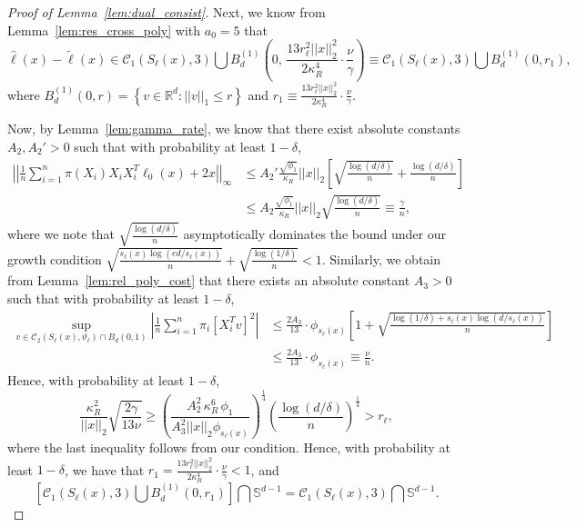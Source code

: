 \documentclass[ejsv2,noshowframe]{imsart}
\theoremstyle{plain}
\theoremstyle{definition}
\theoremstyle{remark}
\newcommand{\norm}[1]{\left|\left| #1 \right|\right|}
\renewcommand{\hat}{\widehat}
\renewcommand{\tilde}{\widetilde}
\begin{document}
\begin{proof}[Proof of Lemma~\ref{lem:dual_consist}]
	Next, we know from Lemma~\ref{lem:res_cross_poly} with $a_0=5$ that 
	$$\hat{\ell}(x)-\tilde{\ell}(x) \in \mathcal{C}_1\left(S_{\ell}(x), 3 \right) \bigcup B_d^{(1)}\left(0,\, \frac{13 r_{\ell}^2 \norm{x}_2^2}{2 \kappa_R^4} \cdot \frac{\nu}{\gamma}\right) \equiv \mathcal{C}_1\left(S_{\ell}(x), 3 \right) \bigcup B_d^{(1)}(0,r_1),$$ 
	where $B_d^{(1)}(0,r) = \left\{v\in \mathbb{R}^d: \norm{v}_1 \leq r\right\}$ and $r_1\equiv \frac{13 r_{\ell}^2 \norm{x}_2^2}{2 \kappa_R^4} \cdot \frac{\nu}{\gamma}$. 
	
	Now, by Lemma~\ref{lem:gamma_rate}, we know that there exist absolute constants $A_2,A_2'>0$ such that with probability at least $1-\delta$,
	\begin{align*}
		\norm{\frac{1}{n}\sum_{i=1}^n \pi(X_i) X_iX_i^T \ell_0(x) + 2x}_{\infty} &\leq A_2' \frac{\sqrt{\phi_1}}{\kappa_R}\norm{x}_2 \left[\sqrt{\frac{\log(d/\delta)}{n}} + \frac{\log(d/\delta)}{n} \right] \\
		&\leq A_2 \frac{\sqrt{\phi_1}}{\kappa_R}\norm{x}_2 \sqrt{\frac{\log(d/\delta)}{n}}\equiv \frac{\gamma}{n},
	\end{align*}
	where we note that $\sqrt{\frac{\log(d/\delta)}{n}}$ asymptotically dominates the bound under our growth condition $\sqrt{\frac{s_{\ell}(x)\log(ed/s_{\ell}(x))}{n}} + \sqrt{\frac{\log(1/\delta)}{n}} < 1$. Similarly, we obtain from Lemma~\ref{lem:rel_poly_cost} that there exists an absolute constant $A_3>0$ such that with probability at least $1-\delta$,
	\begin{align*}
		\sup_{v\in \mathcal{C}_2\left(S_{\ell}(x), \vartheta_{\ell}\right)\cap B_d(0,1)} \left|\frac{1}{n} \sum_{i=1}^n \pi_i\left[X_i^Tv\right]^2 \right| &\leq \frac{2A_3}{13}\cdot \phi_{s_{\ell}(x)}\left[1+ \sqrt{\frac{\log(1/\delta) + s_{\ell}(x) \log\left(d/s_{\ell}(x)\right)}{n}}\right] \\
		&\leq \frac{2A_3}{13}\cdot \phi_{s_{\ell}(x)} \equiv \frac{\nu}{n}.
	\end{align*}
	Hence, with probability at least $1-\delta$,
	$$\frac{\kappa_R^2}{\norm{x}_2} \sqrt{\frac{2\gamma}{13\nu}} \geq \left(\frac{A_2^2 \,\kappa_R^6\, \phi_1}{A_3^2\norm{x}_2 \phi_{s_{\ell}(x)}}\right)^{\frac{1}{4}} \left(\frac{\log(d/\delta)}{n}\right)^{\frac{1}{4}} > r_{\ell},$$
	where the last inequality follows from our condition. Hence, with probability at least $1-\delta$, we have that $r_1= \frac{13 r_{\ell}^2 \norm{x}_2^2}{2 \kappa_R^4} \cdot \frac{\nu}{\gamma} < 1$, and 
	$$\left[\mathcal{C}_1\left(S_{\ell}(x), 3 \right) \bigcup B_d^{(1)}(0,r_1)\right] \bigcap \mathbb{S}^{d-1} = \mathcal{C}_1\left(S_{\ell}(x), 3 \right) \bigcap \mathbb{S}^{d-1}.$$
	

\end{proof}
\end{document}
